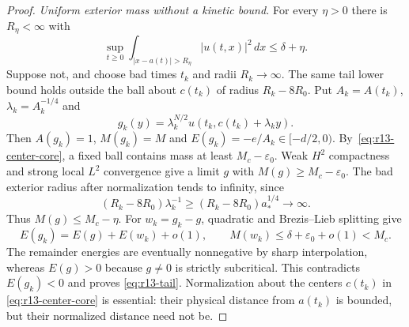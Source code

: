 \begin{proof}
\medskip\noindent\emph{Uniform exterior mass without a kinetic bound.}
For every $\eta>0$ there is $R_\eta<\infty$ with
\begin{equation}\label{eq:r13-tail}
 \sup_{t\ge0}\int_{|x-a(t)|>R_\eta}|u(t,x)|^2\,dx
 \le\delta+\eta.
\end{equation}
Suppose not, and choose bad times $t_k$ and radii $R_k\to\infty$.
The same tail lower bound holds outside the ball about $c(t_k)$ of
radius $R_k-8R_0$. Put $A_k=A(t_k)$, $\lambda_k=A_k^{-1/4}$ and
\[
 g_k(y)=\lambda_k^{N/2}u(t_k,c(t_k)+\lambda_k y).
\]
Then $A(g_k)=1$, $M(g_k)=M$ and $E(g_k)=-e/A_k\in[-d/2,0)$.
By~\eqref{eq:r13-center-core}, a fixed ball contains mass at least
$M_c-\varepsilon_0$. Weak $H^2$ compactness and strong local $L^2$
convergence give a limit $g$ with $M(g)\ge M_c-\varepsilon_0$.
The bad exterior radius after normalization tends to infinity, since
\[
 (R_k-8R_0)\lambda_k^{-1}
 \ge (R_k-8R_0)a_*^{1/4}\longrightarrow\infty.
\]
Thus $M(g)\le M_c-\eta$. For $w_k=g_k-g$, quadratic and
Brezis--Lieb splitting give
\[
 E(g_k)=E(g)+E(w_k)+o(1),\qquad
 M(w_k)\le\delta+\varepsilon_0+o(1)<M_c.
\]
The remainder energies are eventually nonnegative by sharp
interpolation, whereas $E(g)>0$ because $g\ne0$ is strictly
subcritical. This contradicts $E(g_k)<0$ and proves
\eqref{eq:r13-tail}. Normalization about the centers $c(t_k)$ in
\eqref{eq:r13-center-core} is essential: their physical distance from
$a(t_k)$ is bounded, but their normalized distance need not be.


\end{proof}
